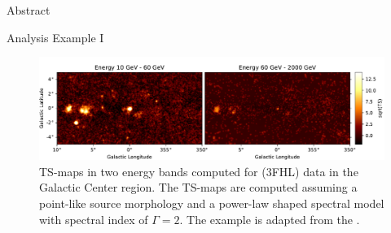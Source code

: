 \documentclass[
    final,
    ]{beamer}
\newlength{\colwidth}
\newcommand{\coloredhref}[3][blue]{\href{#2}{\color{#1}{#3}}}%
\begin{document}
\begin{frame}[t, fragile]
\begin{columns}[t]
\begin{column}{\colwidth}
\begin{block}{Abstract}





  \end{block}

  \begin{block}{Analysis Example I}
    \begin{figure}
      \centering
      \includegraphics[width=\textwidth]{figures/fermi-gc-sqrt-ts.pdf}
      \caption{TS-maps in two energy bands computed for \coloredhref[pink]{https://fermi.gsfc.nasa.gov}{Fermi-LAT} (3FHL) data in the Galactic Center region. The TS-maps are computed assuming a point-like source morphology and a power-law shaped spectral model with spectral index of $\Gamma = 2$. The example is adapted from the \coloredhref[pink]{https://docs.gammapy.org/0.18.2/tutorials/detect.html}{source detection tutorial}.}
    \end{figure}
 

\end{block}
\end{column}
\end{columns}
\end{frame}
\end{document}
